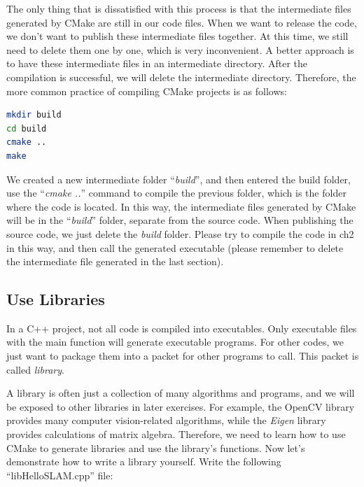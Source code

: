 The only thing that is dissatisfied with this process is that the intermediate files generated by CMake are still in our code files. When we want to release the code, we don't want to publish these intermediate files together. At this time, we still need to delete them one by one, which is very inconvenient. A better approach is to have these intermediate files in an intermediate directory. After the compilation is successful, we will delete the intermediate directory. Therefore, the more common practice of compiling CMake projects is as follows:
\begin{lstlisting}[language=sh,caption=Terminal input]
mkdir build
cd build
cmake ..
make
\end{lstlisting}
We created a new intermediate folder ``\textit{build}'', and then entered the build folder, use the ``\textit{cmake ..}'' command to compile the previous folder, which is the folder where the code is located. In this way, the intermediate files generated by CMake will be in the ``\textit{build}'' folder, separate from the source code. When publishing the source code, we just delete the \textit{build} folder. Please try to compile the code in ch2 in this way, and then call the generated executable (please remember to delete the intermediate file generated in the last section).

\subsection{Use Libraries}
In a C++ project, not all code is compiled into executables. Only executable files with the main function will generate executable programs. For other codes, we just want to package them into a packet for other programs to call. This packet is called \textit{library}.

A library is often just a collection of many algorithms and programs, and we will be exposed to other libraries in later exercises. For example, the OpenCV library provides many computer vision-related algorithms, while the \textit{Eigen} library provides calculations of matrix algebra. Therefore, we need to learn how to use CMake to generate libraries and use the library's functions. Now let's demonstrate how to write a library yourself. Write the following ``libHelloSLAM.cpp'' file:

